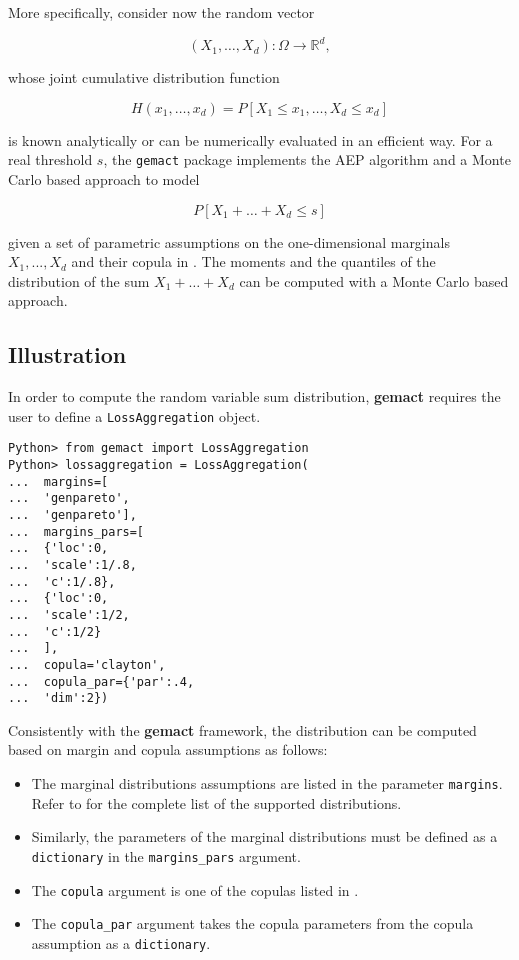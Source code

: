 \documentclass{article}
\begin{document}
More specifically, consider now the random vector

$$\left(X_1, \ldots, X_d\right): \Omega \rightarrow \mathbb{R}^d,$$ 

whose joint cumulative distribution function 

\begin{equation}
\label{eq:jointcdf}
    H\left(x_1,\ldots,x_d\right)=P\left[X_1\le x_1,\ldots,X_d\le x_d\right]  
\end{equation} 

is known analytically or can be numerically evaluated in an efficient way. For a real threshold $s$, the \texttt{gemact} package implements the AEP algorithm \cite{arbenz11} and a Monte Carlo based approach to model 

$$P\left[X_1 + \ldots + X_d \leq s\right]$$

given a set of parametric assumptions on the one-dimensional marginals $X_1, ..., X_d$ and their copula in . The moments and the quantiles of the distribution of the sum $X_1 + \ldots + X_d$ can be computed with a Monte Carlo based approach.


\subsection{Illustration}

In order to compute the random variable sum distribution, \textbf{gemact} requires the user to define a \texttt{LossAggregation} object.

\begin{lstlisting}
Python> from gemact import LossAggregation
Python> lossaggregation = LossAggregation(
...  margins=[
...  'genpareto',
...  'genpareto'],
...  margins_pars=[
...  {'loc':0,
...  'scale':1/.8,
...  'c':1/.8},
...  {'loc':0,
...  'scale':1/2,
...  'c':1/2}
...  ],
...  copula='clayton',
...  copula_par={'par':.4,
...  'dim':2})
\end{lstlisting}

Consistently with the \textbf{gemact} framework, the distribution can be computed based on margin and copula assumptions as follows: 

\begin{itemize}
    \item The  marginal distributions assumptions are listed in the parameter \texttt{margins}. Refer to  for the complete list of the supported distributions.
    
    \item Similarly, the parameters of the marginal distributions must be defined as a \texttt{dictionary} in the \texttt{margins\_pars} argument.
    
    \item The \texttt{copula} argument is one of the copulas listed in .
    
    \item The \texttt{copula\_par} argument takes the copula parameters from the copula assumption as a \texttt{dictionary}.
    
\end{itemize}
\end{document}
